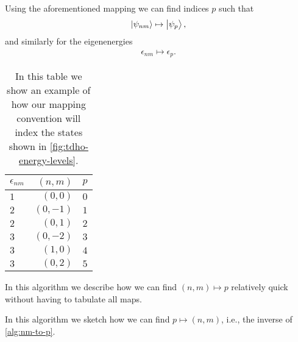             Using the aforementioned mapping we can find indices $p$ such that
            \begin{align}
                \ket{\psi_{nm}} \mapsto \ket{\psi_p},
            \end{align}
            and similarly for the eigenenergies
            \begin{align}
                \epsilon_{nm} \mapsto \epsilon_{p}.
            \end{align}

            \begin{table}
                \centering
                \caption{In this table we show an example of how our mapping
                convention will index the states shown in
                \autoref{fig:tdho-energy-levels}.}
                \begin{tabular}{l|rr}
                    $\epsilon_{nm}$ & $(n, m)$ & $p$ \\
                    \hline
                    $1$ & $(0, 0)$ & $0$ \\
                    $2$ & $(0, -1)$ & $1$ \\
                    $2$ & $(0, 1)$ & $2$ \\
                    $3$ & $(0, -2)$ & $3$ \\
                    $3$ & $(1, 0)$ & $4$ \\
                    $3$ & $(0, 2)$ & $5$
                \end{tabular}
                \label{tab:tdho-mapping}
            \end{table}

            \begin{algorithm}
                \caption{In this algorithm we describe how we can find $(n, m)
                \mapsto p$ relatively quick without having to tabulate all
                maps.}
                \label{alg:nm-to-p}
            \end{algorithm}

            \begin{algorithm}
                \caption{In this algorithm we sketch how we can find $p \mapsto
                (n, m)$, i.e., the inverse of \autoref{alg:nm-to-p}.}
                \label{alg:p-to-nm}
            \end{algorithm}

